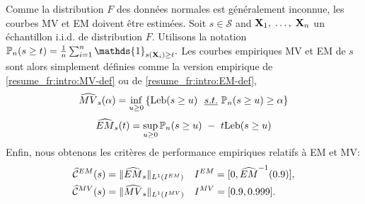 Comme la distribution $F$ des données normales est généralement inconnue, les courbes MV et EM doivent être estimées.
Soit $s\in \mathcal{S}$ and $\mathbf X_1,\; \ldots,\; \mathbf X_n$ un échantillon  i.i.d. de distribution $F$. Utilisons la notation $\mathbb{P}_n(s \ge t)=\frac{1}{n}\sum_{i=1}^n\mathds{1}_{s(\mb X_i)\geq t}.$ 
Les courbes empiriques MV et EM de $s$ sont alors simplement définies comme la version empirique de \eqref{resume_fr:intro:MV-def} ou de \eqref{resume_fr:intro:EM-def}, 
\begin{align}
\label{resume_fr:MV-def-emp}
\widehat{MV}_s(\alpha) = \inf_{u \ge 0} \left\{ \text{Leb}(s \ge u) ~~\emph{s.t.}{}~ \mathbb{P}_n(s \ge u) \ge \alpha \right\}
\end{align}
\begin{align}
\label{resume_fr:EM-def-emp}
\widehat{EM}_s(t) = \sup_{u \ge 0} \mathbb{P}_n(s \ge u) ~-~ t \text{Leb}(s \ge u)
\end{align}
%
%
Enfin, nous obtenons les critères de performance empiriques relatifs à EM et MV:
\begin{align}
\label{resume_fr:eq:standard_emp_EM}\widehat{\mathcal{C}}^{EM}(s) &= \| \widehat{EM}_s \|_{L^1(I^{EM})}  &&I^{EM} = [0,\widehat{EM}^{-1}(0.9)],\\
\label{resume_fr:eq:standard_emp_MV}\widehat{\mathcal{C}}^{MV}(s) &= \| \widehat{MV}_s \|_{L^1(I^{MV})}  &&I^{MV} = [0.9, 0.999].
\end{align}
%

%


